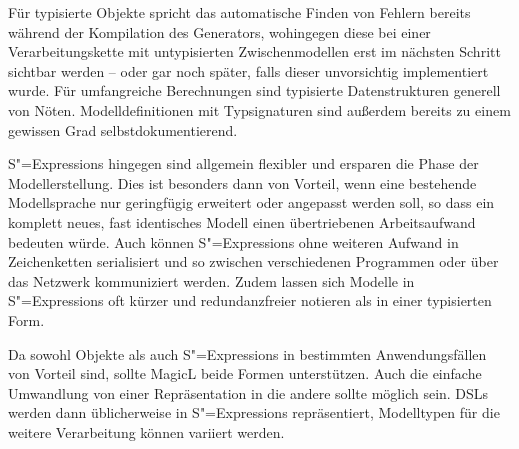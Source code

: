 \documentclass[12pt, a4paper, bibgerm]{scrbook}
\newcommand{\sexps}{S"=Expressions}
\begin{document}
Für typisierte Objekte spricht das automatische Finden von Fehlern
bereits während der Kompilation des Generators, wohingegen diese bei
einer Verarbeitungskette mit untypisierten Zwischenmodellen erst im
nächsten Schritt sichtbar werden -- oder gar noch später,
falls dieser unvorsichtig implementiert wurde. Für umfangreiche
Berechnungen sind typisierte Datenstrukturen generell
von Nöten. Modelldefinitionen mit Typsignaturen sind außerdem bereits zu
einem gewissen Grad selbstdokumentierend.

\sexps{} hingegen sind allgemein flexibler und ersparen die Phase der
Modellerstellung. Dies ist besonders dann von Vorteil, wenn eine
bestehende Modellsprache nur geringfügig erweitert oder angepasst werden
soll, so dass ein komplett neues, fast identisches Modell einen
übertriebenen Arbeitsaufwand bedeuten würde. Auch können \sexps{} ohne
weiteren Aufwand in Zeichenketten serialisiert und so zwischen
verschiedenen Programmen oder über das Netzwerk kommuniziert
werden. Zudem lassen sich Modelle in \sexps{} oft kürzer und
redundanzfreier notieren als in einer typisierten Form.

Da sowohl Objekte als auch \sexps{} in bestimmten Anwendungsfällen von
Vorteil sind, sollte MagicL beide Formen unterstützen. Auch die
einfache Umwandlung von einer Repräsentation in die andere sollte
möglich sein. DSLs werden dann üblicherweise in \sexps{}
repräsentiert, Modelltypen für die weitere Verarbeitung können variiert
werden.
\end{document}
